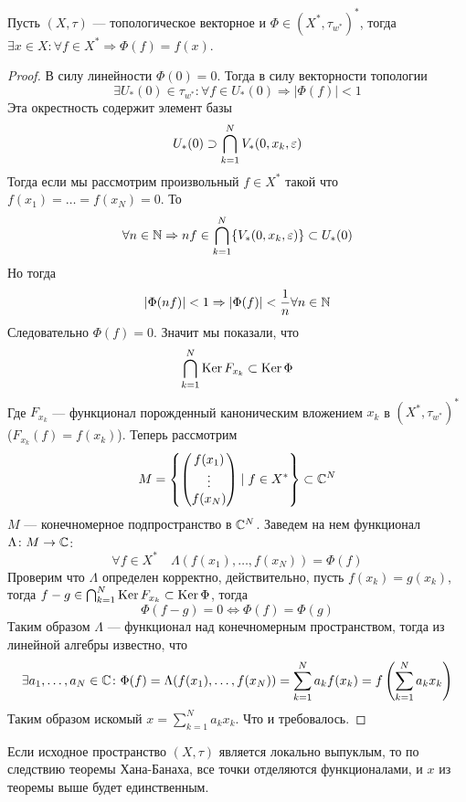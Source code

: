 \begin{theorem}[Шмульян]\label{th:shulian}
	Пусть $(X,\tau)$ --- топологическое векторное и $\Phi \in (X^*, \tau_{w^*})^*$, тогда $\exists x \in X \colon\forall f \in X^* \Rightarrow   \Phi(f) = f(x)$. 
\end{theorem}
\begin{proof}
	В силу линейности $\Phi(0) = 0$. Тогда в силу векторности топологии 
	$$
	\exists U_*(0) \in \tau_{w^*}\colon \forall f \in U_*(0) \Rightarrow |\Phi(f)| < 1
	$$
	Эта окрестность содержит элемент базы
	$$
	U_*(0) \supset \bigcap_{k = 1}^N V_*(0, x_k, \varepsilon)
	$$
	Тогда если мы рассмотрим произвольный $f \in X^*$ такой что $f(x_1) = \dots = f(x_N) = 0$. То
	$$
	\forall n \in \mathbb{N} \Rightarrow nf \in \bigcap_{k = 1}^N\{V_*(0, x_k, \varepsilon)\} \subset U_*(0)
	$$
	Но тогда 
	$$
	|\Phi(nf)| < 1 \Rightarrow |\Phi(f)| < \frac{1}{n} \forall n \in \mathbb{N}
	$$
	Следовательно $\Phi(f) = 0$. Значит мы показали, что 
	$$
	\bigcap_{k=1}^N \operatorname{Ker} F_{x_k} \subset \operatorname{Ker} \Phi
	$$
	Где $F_{x_k}$ --- функционал порожденный каноническим вложением $x_k$ в $(X^*,\tau_{w^*})^*$ ($F_{x_k}(f) = f(x_k)$). Теперь рассмотрим
	$$
	M = \left\{\begin{pmatrix}
		f(x_1) \\
		\vdots \\
		f(x_N)
	\end{pmatrix} \mid f \in X^*\right\} \subset \mathbb{C}^N
	$$
	$M$ --- конечномерное подпространство в $\mathbb{C}^N$. Заведем на нем функционал $\Lambda \colon M \to \mathbb{C}$:
	$$
	\forall f \in X^* \quad	\Lambda(f(x_1), \dots, f(x_N)) = \Phi(f)
	$$
	Проверим что $\Lambda$ определен корректно, действительно, пусть $f(x_k) = g(x_k)$, тогда $f - g \in \bigcap_{k=1}^N \operatorname{Ker} F_{x_k} \subset \operatorname{Ker} \Phi$, тогда 
	$$
	\Phi(f -g)  = 0 \Leftrightarrow \Phi(f) = \Phi(g)
	$$
	Таким образом $\Lambda$ --- функционал над конечномерным пространством, тогда из линейной алгебры известно, что 
	$$
	\exists a_1, \dots, a_N \in \mathbb{C}\colon \Phi(f) = \Lambda(f(x_1), \dots, f(x_N)) = \sum_{k=1}^N a_k f(x_k) = f\left(\sum_{k=1}^N a_k x_k\right)
	$$
	Таким образом искомый $x = \sum_{k=1}^N a_k x_k$. Что и требовалось.
\end{proof}
\begin{remark}
	Если исходное пространство $(X,\tau)$ является локально выпуклым, то по следствию теоремы Хана-Банаха, все точки отделяются функционалами, и $x$ из теоремы выше будет единственным.
\end{remark}